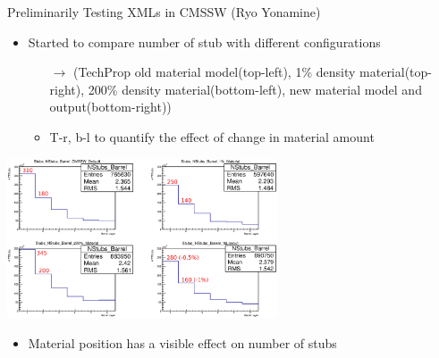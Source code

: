 \documentclass[pdftex, 11pt]{beamer}
\begin{document}
\begin{frame}{Preliminarily Testing XMLs in CMSSW \fontsize{7}{11}\selectfont (Ryo Yonamine)\normalsize}
  \begin{itemize}
  \item Started to \alert{compare} number of \alert{stub} with different configurations
    \begin{itemize}
    \item[$\to$] (TechProp \alert{old} material model(top-left), \alert{1\%} density material(top-right), \alert{200\%} density material(bottom-left), \alert{new} material model and output(bottom-right))
    \item T-r, b-l to \alert{quantify} the effect of change in material \alert{amount}
    \end{itemize}
  \end{itemize}
  \begin{center}
    \includegraphics[width=8cm]{img/nstubs_barrel.eps}\\
  \end{center}
  \begin{itemize}
  \item Material position has a visible \alert{effect} on number of \alert{stubs}
  \end{itemize}
\end{frame}
\end{document}

